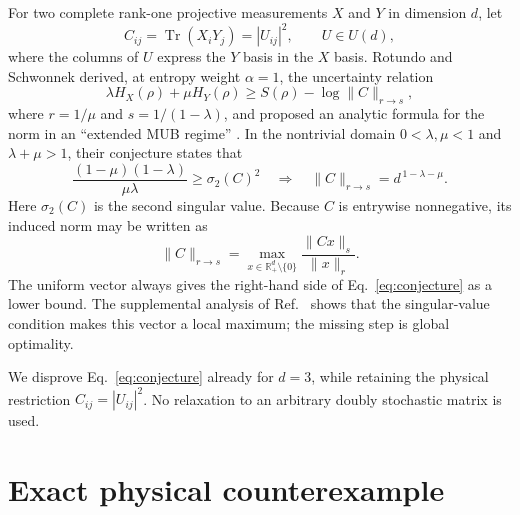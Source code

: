 \documentclass[aps,pra,reprint,superscriptaddress,nofootinbib,longbibliography]{revtex4-2}
\begin{document}
For two complete rank-one projective measurements $X$ and $Y$ in dimension
$d$, let
\begin{equation}
 C_{ij}=\operatorname{Tr}(X_iY_j)=|U_{ij}|^2,
 \qquad U\in U(d),
 \label{eq:overlap}
\end{equation}
where the columns of $U$ express the $Y$ basis in the $X$ basis.  Rotundo and
Schwonnek derived, at entropy weight $\alpha=1$, the uncertainty relation
\begin{equation}
 \lambda H_X(\rho)+\mu H_Y(\rho)
 \geq S(\rho)-\log\|C\|_{r\to s},
 \label{eq:proved-bound}
\end{equation}
where $r=1/\mu$ and $s=1/(1-\lambda)$, and proposed an analytic formula for
the norm in an ``extended MUB regime''
\cite{RotundoSchwonnek2024}.  In the nontrivial domain
$0<\lambda,\mu<1$ and $\lambda+\mu>1$, their conjecture states that
\begin{equation}
 \frac{(1-\mu)(1-\lambda)}{\mu\lambda}\geq \sigma_2(C)^2
 \quad\Longrightarrow\quad
 \|C\|_{r\to s}=d^{\,1-\lambda-\mu}.
 \label{eq:conjecture}
\end{equation}
Here $\sigma_2(C)$ is the second singular value.  Because $C$ is entrywise
nonnegative, its induced norm may be written as
\begin{equation}
 \|C\|_{r\to s}
 =\max_{x\in\mathbb R_+^d\setminus\{0\}}
 \frac{\|Cx\|_s}{\|x\|_r}.
 \label{eq:norm}
\end{equation}
The uniform vector always gives the right-hand side of
Eq.~\eqref{eq:conjecture} as a lower bound.  The supplemental analysis of
Ref.~\cite{RotundoSchwonnek2024} shows that the singular-value condition makes
this vector a local maximum; the missing step is global optimality.

We disprove Eq.~\eqref{eq:conjecture} already for $d=3$, while retaining the
physical restriction $C_{ij}=|U_{ij}|^2$.  No relaxation to an arbitrary
doubly stochastic matrix is used.

\section{Exact physical counterexample}
\end{document}
